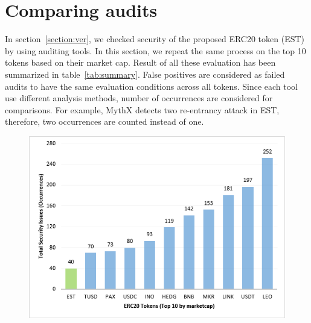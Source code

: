 
\section{Comparing audits}
In section~\ref{section:ver}, we checked security of the proposed ERC20 token (EST) by using auditing tools. In this section, we repeat the same process on the top 10 tokens based on their market cap\cite{EtherScan}. Result of all these evaluation has been summarized in table~\ref{tab:summary}. False positives are considered as failed audits to have the same evaluation conditions across all tokens. Since each tool use different analysis methods, number of occurrences are considered for comparisons. For example, MythX detects two re-entrancy attack in EST, therefore, two occurrences are counted instead of one. 

\begin{figure}[t!]
	\centering
	\includegraphics[width=1.0\linewidth]{figures/chart.png}
	\label{fig:chart}
\end{figure}

